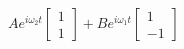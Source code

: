 \documentclass[preview]{standalone}
\begin{document}
\begin{center}
$Ae^{i \omega_2 t}\begin{bmatrix} 1 \\ 1\end{bmatrix} + B e^{i \omega_1 t}\begin{bmatrix} 1 \\ -1\end{bmatrix}$
\end{center}
\end{document}
